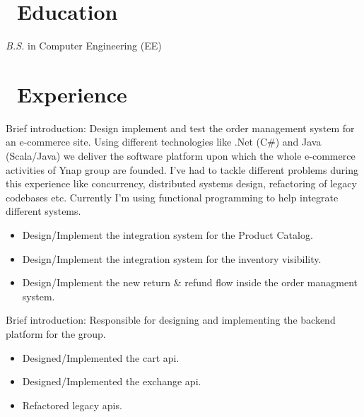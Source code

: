 \documentclass{resume}
\begin{document}



\section{\faGraduationCap\ Education}
\textit{B.S.} in Computer Engineering (EE)

\section{\faUsers\ Experience}
Brief introduction: Design implement and test the order management system for an e-commerce site.
Using different technologies like .Net (C#) and Java (Scala/Java) we deliver the software platform upon which the whole e-commerce activities of Ynap group are founded.
I’ve had to tackle different problems during this experience like concurrency, distributed systems design, refactoring of legacy codebases etc.
Currently I’m using functional programming to help integrate different systems.
\begin{itemize}
  \item Design/Implement the integration system for the Product Catalog.
  \item Design/Implement the integration system for the inventory visibility.
  \item Design/Implement the new return & refund flow inside the order managment system.
\end{itemize}

Brief introduction: Responsible for designing and implementing the backend platform for the group.
\begin{itemize}
  \item Designed/Implemented the cart api.
  \item Designed/Implemented the exchange api.
  \item Refactored legacy apis.
\end{itemize}
\end{document}
